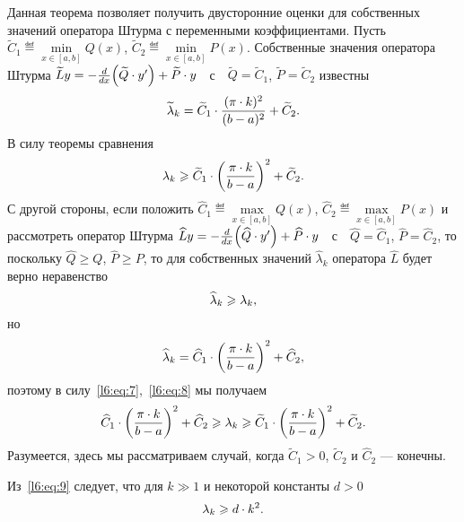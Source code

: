 Данная теорема позволяет получить двусторонние оценки для собственных значений оператора Штурма с переменными коэффициентами. Пусть $\widetilde{C}_1\eqdef\min\limits_{x\in[a,b]}Q(x)$, $\widetilde{C}_2\eqdef\min\limits_{x\in[a,b]}P(x)$. Собственные значения оператора Штурма $\widetilde{L}y=-\frac{d}{dx}\Big(\widetilde{Q}\cdot y'\Big)+\widetilde{P}\cdot y\quad$с$\quad\widetilde{Q}=\widetilde{C}_1$, $\widetilde{P}=\widetilde{C}_2$ известны 
\begin{equation*}
	\hfill\widetilde{\lambda}_k=\widetilde{C}_1\cdot\frac{(\pi\cdot k)^2}{(b-a)^2}+\widetilde{C}_2.\hfill
\end{equation*}
В силу теоремы сравнения
\begin{equation}
	\label{l6:eq:7}
	\hfill\lambda_k\geqslant\widetilde{C}_1\cdot\left(\frac{\pi\cdot k}{b-a}\right)^2+\widetilde{C}_2.\hfill
\end{equation}
С другой стороны, если положить $\widehat{C}_1\eqdef\max\limits_{x\in[a,b]}Q(x)$, $\widehat{C}_2\eqdef\max\limits_{x\in[a,b]}P(x)$ и рассмотреть оператор Штурма $\widehat{L}y=-\frac{d}{dx}\Big(\widehat{Q}\cdot y'\Big)+\widehat{P}\cdot y\quad$с$\quad\widehat{Q}=\widehat{C}_1$, $\widehat{P}=\widehat{C}_2$, то поскольку $\widehat{Q}\geqslant Q$, $\widehat{P}\geqslant P$, то для собственных значений $\widehat{\lambda}_k$ оператора $\widehat{L}$ будет верно неравенство
\begin{equation}
	\label{l6:eq:8}
	\hfill \widehat{\lambda}_k\geqslant\lambda_k,\hfill
\end{equation}
но 
\begin{equation*}
	\hfill\widehat{\lambda}_k=\widehat{C}_1\cdot \left(\frac{\pi\cdot k}{b-a}\right)^2+\widehat{C}_2,\hfill
\end{equation*}
поэтому в силу~\eqref{l6:eq:7},~\eqref{l6:eq:8} мы получаем
\begin{equation}
	\label{l6:eq:9}
	\hfill\widehat{C}_1\cdot\left(\frac{\pi\cdot k}{b-a}\right)^2+\widehat{C}_2\geqslant\lambda_k\geqslant\widetilde{C}_1\cdot\left(\frac{\pi\cdot k}{b-a}\right)^2+\widetilde{C}_2.\hfill
\end{equation}
Разумеется, здесь мы рассматриваем случай, когда $\widetilde{C}_1>0$, $\widetilde{C}_2$ и $\widehat{C}_2$ --- конечны. 

Из~\eqref{l6:eq:9} следует, что для $k\gg1$ и некоторой константы $d>0$ 
\begin{equation}
	\label{l6:eq:10}
	\hfill\lambda_k\geqslant d\cdot k^2.\hfill
\end{equation} 
